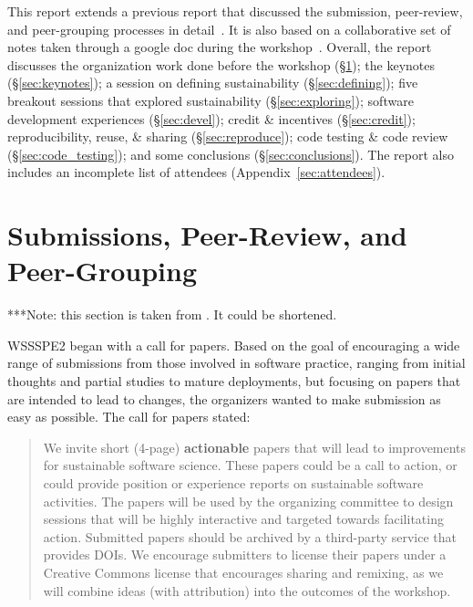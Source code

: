 \documentclass[11pt, oneside]{amsart}
\newcommand{\note}[1]{ {\textcolor{blueish}    { ***Note:      #1 }}}
\begin{document}
This report extends a previous report that discussed the submission,
peer-review, and peer-grouping processes in detail~\cite{WSSSPE2-pre-report}.
It is also based on a collaborative set of notes taken through a google doc
during the workshop~\cite{WSSSPE2-google-notes}. Overall, the report discusses
the organization work done before the workshop (\S\ref{sec:preworkshop}); the
keynotes (\S\ref{sec:keynotes}); a session on defining sustainability
(\S\ref{sec:defining}); five breakout sessions that explored sustainability
(\S\ref{sec:exploring}); software development experiences (\S\ref{sec:devel});
credit \& incentives (\S\ref{sec:credit}); reproducibility, reuse, \& sharing
(\S\ref{sec:reproduce}); code testing \& code review
(\S\ref{sec:code_testing}); and some conclusions (\S\ref{sec:conclusions}). The
report also includes an incomplete list of attendees (Appendix~\ref{sec:attendees}).

\section{Submissions, Peer-Review, and Peer-Grouping} \label{sec:preworkshop}

\note{this section is taken from \cite{WSSSPE2-pre-report}. It could be shortened.}

WSSSPE2 began with a call for papers. Based on the goal of encouraging a wide
range of submissions from those involved in software practice, ranging from
initial thoughts and partial studies to mature deployments, but focusing on
papers that are intended to lead to changes, the organizers wanted to make
submission as easy as possible. The call for papers stated:

\begin{quote} We invite short (4-page) \textbf{actionable} papers that will lead
to improvements for sustainable software science. These papers could be a call
to action, or could provide position or experience reports on sustainable
software activities. The papers will be used by the organizing committee to
design sessions that will be highly interactive and targeted towards
facilitating action. Submitted papers should be archived by a third-party
service that provides DOIs. We encourage submitters to license their papers
under a Creative Commons license that encourages sharing and remixing, as we
will combine ideas (with attribution) into the outcomes of the workshop.
\end{quote}
\end{document}
